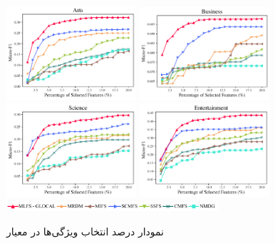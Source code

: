 \begin{figure}
	\centering
	{\includegraphics[width=0.43\textwidth]{figures/Micro/PSF(Arts).pdf}}
	{\includegraphics[width=0.43\textwidth]{figures/Micro/PSF(Business).pdf}}
	\\ 
	{\includegraphics[width=0.43\textwidth]{figures/Micro/PSF(Science).pdf}}
	{\includegraphics[width=0.43\textwidth]{figures/Micro/PSF(Entertainment).pdf}}
	{\includegraphics[width=0.7\textwidth]{figures/Micro/FL.pdf}}
	\caption{نمودار درصد انتخاب ویژگی‌ها در معیار }
	\label{fig:fmic}
\end{figure}
